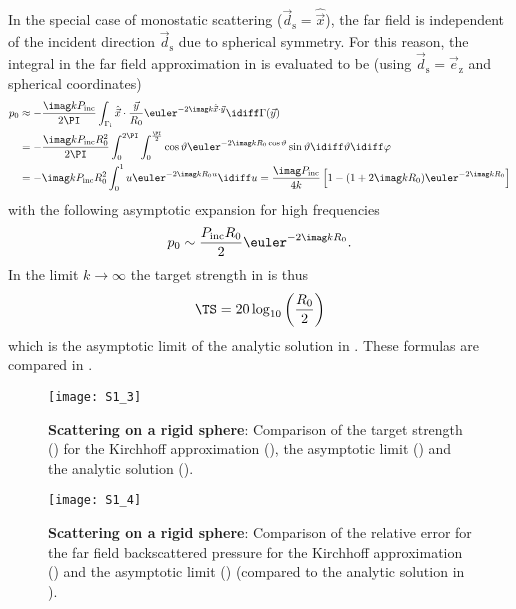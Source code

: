 In the special case of monostatic scattering ($\vec{d}_{\mathrm{s}}=\hat{\vec{x}}$), the far field is independent of the incident direction $\vec{d}_{\mathrm{s}}$ due to spherical symmetry. For this reason, the integral in the far field approximation in  is evaluated to be (using $\vec{d}_{\mathrm{s}}=\vec{e}_{\mathrm{z}}$ and spherical coordinates)
\begin{align}\label{Eq4:exactHelmholtz}
	p_0 &\approx -\frac{\imag kP_{\mathrm{inc}}}{2\PI}\int_{\Gamma_{\mathrm{i}}} \hat{\vec{x}}\cdot\frac{\vec{y}}{R_0} \euler^{-2\imag k \hat{\vec{x}}\cdot\vec{y}}\idiff \Gamma(\vec{y}) \\
	&= -\frac{\imag kP_{\mathrm{inc}}R_0^2}{2\PI}\int_0^{2\PI}\int_0^{\frac{\PI}{2}} \cos\vartheta \euler^{-2\imag k R_0 \cos\vartheta}\sin\vartheta\idiff\vartheta\idiff\varphi \\
	&= -\imag kP_{\mathrm{inc}}R_0^2\int_0^1 u \euler^{-2\imag k R_0 u}\idiff u = \frac{\imag P_{\mathrm{inc}}}{4k}\left[1-(1+2\imag kR_0)\euler^{-2\imag kR_0}\right]
\end{align}
with the following asymptotic expansion for high frequencies
\begin{equation}\label{Eq4:asymptotic_p_0}
	p_0 \sim \frac{P_{\mathrm{inc}}R_0}{2}\euler^{-2\imag kR_0}.
\end{equation}
In the limit $k\to\infty$ the target strength in  is thus
\begin{equation}\label{Eq4:asymptotic_TS}
	\TS = 20\log_{10}\left(\frac{R_0}{2}\right)
\end{equation}
which is the asymptotic limit of the analytic solution in . These formulas are compared in .
\begin{figure}
	\centering
	\texttt{[image: S1\_3]}
	\caption{\textbf{Scattering on a rigid sphere}: Comparison of the target strength () for the Kirchhoff approximation (), the asymptotic limit () and the analytic solution ().}
	\label{Fig4:comparisonRigidSphere}
\end{figure}
\begin{figure}
	\centering
	\texttt{[image: S1\_4]}
	\caption{\textbf{Scattering on a rigid sphere}: Comparison of the relative error for the far field backscattered pressure for the Kirchhoff approximation () and the asymptotic limit () (compared to the analytic solution in ).}
	\label{Fig4:comparisonRigidSphereError}
\end{figure}


